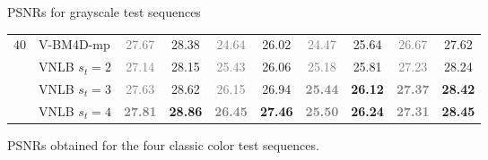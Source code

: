 \documentclass[mathserif, 8pt]{beamer}
\newcommand{\bsic}[1]{\textcolor{gray}{#1}}
\newcommand{\Bsic}[1]{\textcolor{gray}{\textbf{#1}}}
\newcommand{\Best}[1]{\textbf{\textcolor{MyOrangeBrighter}{#1}}}
\begin{document}
\begin{frame}{PSNRs for grayscale test sequences}
\begin{center}
{\begin{tabular}{ c | l |c c | c c | c c | c c}
%
			\multirow{5}{*}{$40$} & V-BM4D-mp            & \bsic{27.67} &       28.38  & \bsic{24.64} &       26.02  & \bsic{24.47} &       25.64  & \bsic{26.67} &       27.62  \\
			                      & VNLB   $s_t = 2$     & \bsic{27.14} &       28.15  & \bsic{25.43} &       26.06  & \bsic{25.18} &       25.81  & \bsic{27.23} &       28.24  \\
										 & VNLB   $s_t = 3$     & \bsic{27.63} &       28.62  & \bsic{26.15} &       26.94  & \Bsic{25.44} & \Best{26.12} & \Bsic{27.37} & \Best{28.42} \\
			                      & VNLB   $s_t = 4$     & \Bsic{27.81} & \Best{28.86} & \Bsic{26.45} & \Best{27.46} & \Bsic{25.50} & \Best{26.24} & \Bsic{27.31} & \Best{28.45} \\\hline
		\end{tabular}}

		\bigskip

		PSNRs obtained for the four classic color test sequences.
	\end{center}
\end{frame}
\end{document}
